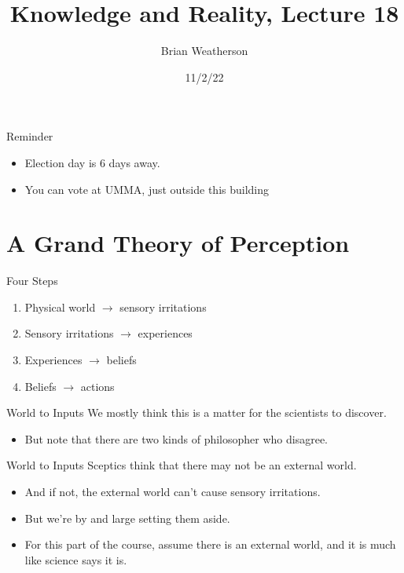 \documentclass[
  17pt,
  letterpaper,
  ignorenonframetext,
  aspectratio=169,
  handout,
  xcolor={dvipsnames}]{beamer}
\title{Knowledge and Reality, Lecture 18}
\author{Brian Weatherson}
\date{11/2/22}
\providecommand{\tightlist}{%
  \setlength{\itemsep}{0pt}\setlength{\parskip}{0pt}}\usepackage{longtable,booktabs,array}
\begin{document}
\frame{\titlepage}
\ifdefined\Shaded\renewenvironment{Shaded}{\begin{tcolorbox}[sharp corners, interior hidden, borderline west={3pt}{0pt}{shadecolor}, enhanced, breakable, frame hidden, boxrule=0pt]}{\end{tcolorbox}}\fi

\begin{frame}{Reminder}
\protect\hypertarget{reminder}{}
\begin{itemize}[<+->]
\tightlist
\item
  Election day is 6 days away.
\item
  You can vote at UMMA, just outside this building
\end{itemize}
\end{frame}

\hypertarget{a-grand-theory-of-perception}{%
\section{A Grand Theory of
Perception}\label{a-grand-theory-of-perception}}

\begin{frame}{Four Steps}
\protect\hypertarget{four-steps}{}
\begin{enumerate}[<+->]
\tightlist
\item
  Physical world \(\rightarrow\) sensory irritations
\item
  Sensory irritations \(\rightarrow\) experiences
\item
  Experiences \(\rightarrow\) beliefs
\item
  Beliefs \(\rightarrow\) actions
\end{enumerate}
\end{frame}

\begin{frame}{World to Inputs}
\protect\hypertarget{world-to-inputs}{}
We mostly think this is a matter for the scientists to discover.

\begin{itemize}[<+->]
\tightlist
\item
  But note that there are two kinds of philosopher who disagree.
\end{itemize}
\end{frame}

\begin{frame}{World to Inputs}
\protect\hypertarget{world-to-inputs-1}{}
Sceptics think that there may not be an external world.

\begin{itemize}[<+->]
\tightlist
\item
  And if not, the external world can't cause sensory irritations.
\item
  But we're by and large setting them aside.
\item
  For this part of the course, assume there is an external world, and it
  is much like science says it is.
\end{itemize}
\end{frame}
\end{document}
